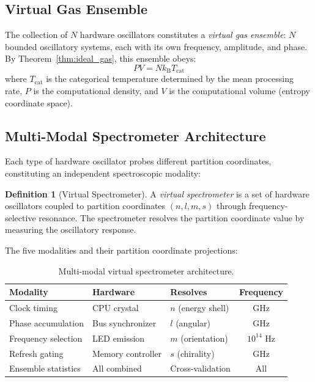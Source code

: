 \documentclass[11pt,twocolumn,a4paper]{article}
\theoremstyle{definition}
\newtheorem{definition}[theorem]{Definition}
\theoremstyle{remark}
\newcommand{\kB}{k_{\mathrm{B}}}
\begin{document}
\subsection{Virtual Gas Ensemble}

The collection of $N$ hardware oscillators constitutes a \emph{virtual gas ensemble}: $N$ bounded oscillatory systems, each with its own frequency, amplitude, and phase. By Theorem~\ref{thm:ideal_gas}, this ensemble obeys:
\begin{equation}
PV = N\kB T_{\mathrm{cat}}
\end{equation}
where $T_{\mathrm{cat}}$ is the categorical temperature determined by the mean processing rate, $P$ is the computational density, and $V$ is the computational volume (entropy coordinate space).

\subsection{Multi-Modal Spectrometer Architecture}

Each type of hardware oscillator probes different partition coordinates, constituting an independent spectroscopic modality:

\begin{definition}[Virtual Spectrometer]
A \emph{virtual spectrometer} is a set of hardware oscillators coupled to partition coordinates $(n, l, m, s)$ through frequency-selective resonance. The spectrometer resolves the partition coordinate value by measuring the oscillatory response.
\end{definition}

The five modalities and their partition coordinate projections:

\begin{table}[H]
\centering
\caption{Multi-modal virtual spectrometer architecture.}
\label{tab:spectrometer}
\small
\begin{tabular}{lllc}
\toprule
\textbf{Modality} & \textbf{Hardware} & \textbf{Resolves} & \textbf{Frequency} \\
\midrule
Clock timing & CPU crystal & $n$ (energy shell) & GHz \\
Phase accumulation & Bus synchronizer & $l$ (angular) & GHz \\
Frequency selection & LED emission & $m$ (orientation) & $10^{14}$ Hz \\
Refresh gating & Memory controller & $s$ (chirality) & GHz \\
Ensemble statistics & All combined & Cross-validation & All \\
\bottomrule
\end{tabular}
\end{table}
\end{document}
